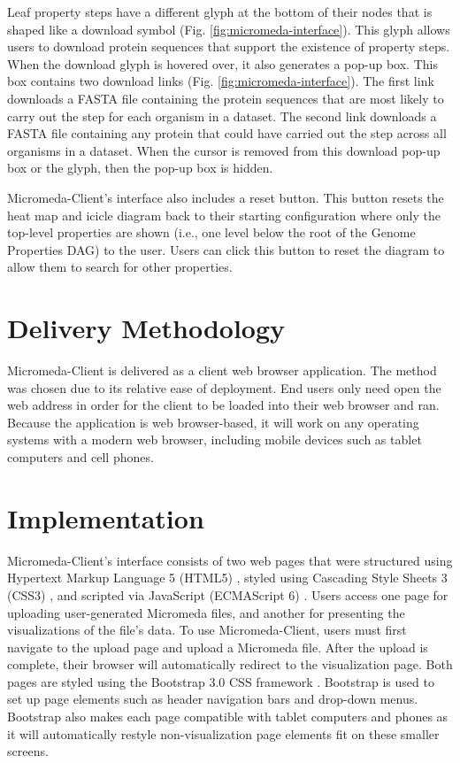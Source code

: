 Leaf property steps have a different glyph at the bottom of their nodes that is shaped like a download symbol (Fig. \ref{fig:micromeda-interface}). This glyph allows users to download protein sequences that support the existence of property steps. When the download glyph is hovered over, it also generates a pop-up box. This box contains two download links (Fig. \ref{fig:micromeda-interface}). The first link downloads a FASTA file containing the protein sequences that are most likely to carry out the step for each organism in a dataset. The second link downloads a FASTA file containing any protein that could have carried out the step across all organisms in a dataset. When the cursor is removed from this download pop-up box or the glyph, then the pop-up box is hidden.

Micromeda-Client's interface also includes a reset button. This button resets the heat map and icicle diagram back to their starting configuration where only the top-level properties are shown (i.e., one level below the root of the Genome Properties DAG) to the user. Users can click this button to reset the diagram to allow them to search for other properties.

\section{Delivery Methodology} \label{client-delivery-method}

Micromeda-Client is delivered as a client web browser application. The method was chosen due to its relative ease of deployment. End users only need open the web address in order for the client to be loaded into their web browser and ran. Because the application is web browser-based, it will work on any operating systems with a modern web browser, including mobile devices such as tablet computers and cell phones.

\section{Implementation} \label{client-implementation}

Micromeda-Client's interface consists of two web pages that were structured using Hypertext Markup Language 5 (HTML5) \cite{HTML5}, styled using Cascading Style Sheets 3 (CSS3) \cite{CSS3}, and scripted via JavaScript (ECMAScript 6) \cite{flanagan2006javascript}. Users access one page for uploading user-generated Micromeda files, and another for presenting the visualizations of the file's data. To use Micromeda-Client, users must first navigate to the upload page and upload a Micromeda file. After the upload is complete, their browser will automatically redirect to the visualization page. Both pages are styled using the Bootstrap 3.0 CSS framework \cite{spurlock2013bootstrap}. Bootstrap is used to set up page elements such as header navigation bars and drop-down menus. Bootstrap also makes each page compatible with tablet computers and phones as it will automatically restyle non-visualization page elements fit on these smaller screens.

